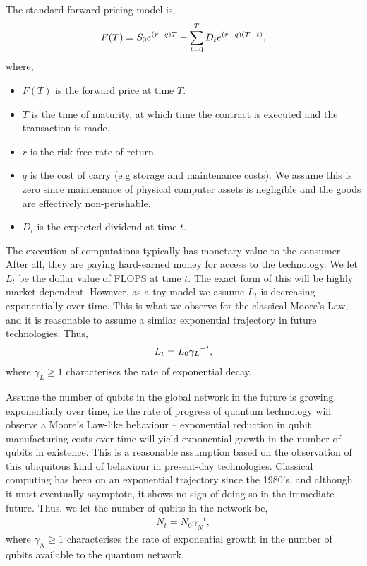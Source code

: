 \documentclass[aps,pra,twocolumn,amsmath,amssymb,nofootinbib,superscriptaddress]{revtex4}
\begin{document}
The standard forward pricing model is,
\begin{align} \index{Forward contract pricing model}
F(T) = S_0 e^{(r-q)T} - \sum_{t=0}^T D_t e^{(r-q)(T-t)},
\end{align}
where,
\begin{itemize}
	\item $F(T)$ is the forward price at time $T$.
	\item $T$ is the time of maturity, at which time the contract is executed and the transaction is made.
	\item $r$ is the risk-free rate of return.
	\item $q$ is the cost of carry (e.g storage and maintenance costs). We assume this is zero since maintenance of physical computer assets is negligible and the goods are effectively non-perishable.
	\item $D_t$ is the expected dividend at time $t$.
\end{itemize}

The execution of computations typically has monetary value to the consumer. After all, they are paying hard-earned money for access to the technology. We let $L_t$ be the dollar value of FLOPS at time $t$. The exact form of this will be highly market-dependent. However, as a toy model we assume $L_t$ is decreasing exponentially over time. This is what we observe for the classical Moore's Law, and it is reasonable to assume a similar exponential trajectory in future technologies. Thus,
\begin{align}\index{Cost of computation}
	L_t = L_0{\gamma_L}^{-t},
\end{align}
where \mbox{$\gamma_L\geq 1$} characterises the rate of exponential decay.

Assume the number of qubits in the global network in the future is growing exponentially over time, i.e the rate of progress of quantum technology will observe a Moore's Law-like behaviour -- exponential reduction in qubit manufacturing costs over time will yield exponential growth in the number of qubits in existence. This is a reasonable assumption based on the observation of this ubiquitous kind of behaviour in present-day technologies. Classical computing has been on an exponential trajectory since the 1980's, and although it must eventually asymptote, it shows no sign of doing so in the immediate future. Thus, we let the number of qubits in the network be,
\begin{align}
	N_t = N_0 {\gamma_N}^{t},
\end{align}
where \mbox{$\gamma_N\geq 1$} characterises the rate of exponential growth in the number of qubits available to the quantum network.
\end{document}
